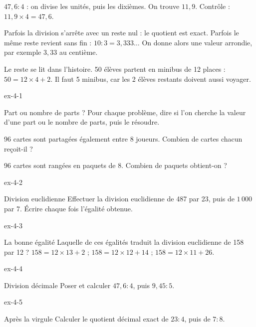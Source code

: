 \begin{exemple}$47{,}6:4$ : on divise les unités, puis les dixièmes. On trouve $11{,}9$. Contrôle : $11{,}9\times4=47{,}6$.\end{exemple}
\begin{propriete}Parfois la division s’arrête avec un reste nul : le quotient est exact. Parfois le même reste revient sans fin : $10:3=3{,}333\ldots$ On donne alors une valeur arrondie, par exemple $3{,}33$ au centième.\end{propriete}
\begin{attention}Le reste se lit dans l’histoire. 50 élèves partent en minibus de 12 places : $50=12\times4+2$. Il faut 5 minibus, car les 2 élèves restants doivent aussi voyager.\end{attention}

\clearpage{}
\begin{blocLivre}{ex-4-1}\begin{exercice}[1]{Part ou nombre de parts ?}
Pour chaque problème, dire si l’on cherche la valeur d’une part ou le nombre de parts, puis le résoudre.\begin{questions}
\item 96 cartes sont partagées également entre 8 joueurs. Combien de cartes chacun reçoit-il ?
\item 96 cartes sont rangées en paquets de 8. Combien de paquets obtient-on ?
\end{questions}
\end{exercice}\end{blocLivre}
\begin{blocLivre}{ex-4-2}\begin{exercice}[1]{Division euclidienne}
Effectuer la division euclidienne de 487 par 23, puis de $1\,000$ par 7. Écrire chaque fois l’égalité obtenue.
\end{exercice}\end{blocLivre}
\begin{blocLivre}{ex-4-3}\begin{exercice}[1]{La bonne égalité}
Laquelle de ces égalités traduit la division euclidienne de 158 par 12 ? $158=12\times13+2$ ; $158=12\times12+14$ ; $158=12\times11+26$.
\end{exercice}\end{blocLivre}
\begin{blocLivre}{ex-4-4}\begin{exercice}[1]{Division décimale}
Poser et calculer $47{,}6:4$, puis $9{,}45:5$.
\end{exercice}\end{blocLivre}
\begin{blocLivre}{ex-4-5}\begin{exercice}[1]{Après la virgule}
Calculer le quotient décimal exact de $23:4$, puis de $7:8$.
\end{exercice}\end{blocLivre}

